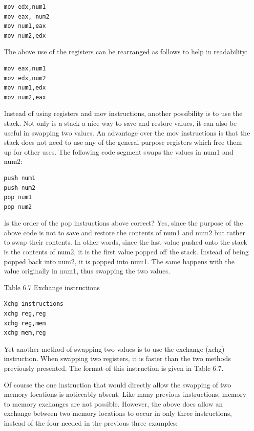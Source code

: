 \documentclass[10pt]{book}
\begin{document}
\begin{center}
\begin{center}
\begin{verbatim}
mov edx,num1
mov eax, num2
mov num1,eax
mov num2,edx
\end{verbatim}

The above use of the registers can be rearranged as follows to help in readability:

\begin{verbatim}
mov eax,num1
mov edx,num2
mov num1,edx
mov num2,eax
\end{verbatim}

Instead of using registers and mov instructions, another possibility is to use the stack. Not only is a stack a nice way to save and restore values, it can also be useful in swapping two values. An advantage over the mov instructions is that the stack does not need to use any of the general purpose registers which free them up for other uses. The following code segment swaps the values in num1 and num2:

\begin{verbatim}
push num1
push num2
pop num1
pop num2
\end{verbatim}

Is the order of the pop instructions above correct? Yes, since the purpose of the above code is not to save and restore the contents of num1 and num2 but rather to swap their contents. In other words, since the last value pushed onto the stack is the contents of num2, it is the first value popped off the stack. Instead of being popped back into num2, it is popped into num1. The same happens with the value originally in num1, thus swapping the two values.

Table 6.7 Exchange instructions

\begin{verbatim}
Xchg instructions
xchg reg,reg
xchg reg,mem
xchg mem,reg
\end{verbatim}

Yet another method of swapping two values is to use the exchange (xchg) instruction. When swapping two registers, it is faster than the two methods previously presented. The format of this instruction is given in Table 6.7.


Of course the one instruction that would directly allow the swapping of two memory locations is noticeably absent. Like many previous instructions, memory to memory exchanges are not possible. However, the above does allow an exchange between two memory locations to occur in only three instructions, instead of the four needed in the previous three examples:


\end{center}
\end{center}
\end{document}
